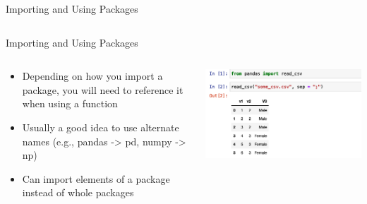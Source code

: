 \documentclass[10pt, aspectratio=169]{beamer}
\begin{document}
{\begin{frame}{Importing and Using Packages}
\begin{columns}
\begin{column}{0.5\textwidth}
\begin{center}
     \end{center}
\end{column}
\end{columns}
    
\end{frame}


\begin{frame}{Importing and Using Packages}
  \begin{columns}
\begin{column}{0.5\textwidth}
    \begin{itemize}
        \item Depending on how you import a package, you will need to reference it when using a function
        \item Usually a good idea to use alternate names (e.g., pandas -> pd, numpy -> np)
        \item Can import elements of a package instead of whole packages
    \end{itemize}
\end{column}
\begin{column}{0.5\textwidth}  %
    \begin{center}
      \includegraphics[scale=.28]{Day 1/Slides/LaTeX files/import_3.png}      
     \end{center}
\end{column}
\end{columns}
    
\end{frame}


}
\end{document}
